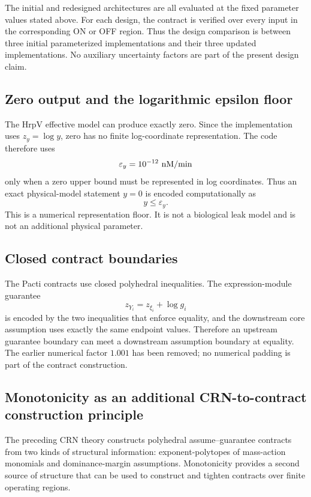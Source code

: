 The initial and redesigned architectures are all evaluated at the fixed
parameter values stated above. For each design, the contract is verified over
every input in the corresponding ON or OFF region. Thus the design comparison
is between three initial parameterized implementations and their three updated
implementations. No auxiliary uncertainty factors are part of the present
design claim.

\subsection{Zero output and the logarithmic epsilon floor}

The HrpV effective model can produce exactly zero. Since the implementation
uses $z_y=\log y$, zero has no finite log-coordinate representation. The code
therefore uses
\[
\varepsilon_y=10^{-12}~{\rm nM/min}
\]
only when a zero upper bound must be represented in log coordinates. Thus an
exact physical-model statement $y=0$ is encoded computationally as
\[
y\le\varepsilon_y.
\]
This is a numerical representation floor. It is not a biological leak model
and is not an additional physical parameter.

\subsection{Closed contract boundaries}

The Pacti contracts use closed polyhedral inequalities. The expression-module
guarantee
\[
z_{Y_i}=z_{\xi_i}+\log g_i
\]
is encoded by the two inequalities that enforce equality, and the downstream
core assumption uses exactly the same endpoint values. Therefore an upstream
guarantee boundary can meet a downstream assumption boundary at equality.
The earlier numerical factor $1.001$ has been removed; no numerical padding is
part of the contract construction.

\subsection{Monotonicity as an additional CRN-to-contract construction principle}

The preceding CRN theory constructs polyhedral assume--guarantee contracts
from two kinds of structural information: exponent-polytopes of mass-action
monomials and dominance-margin assumptions. Monotonicity provides a second
source of structure that can be used to construct and tighten contracts over
finite operating regions.

